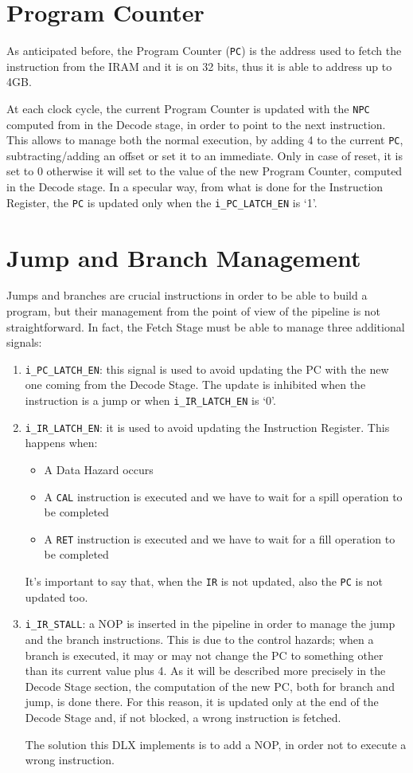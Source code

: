 \section{Program Counter}
As anticipated before, the Program Counter (\texttt{PC}) is the address used to fetch the instruction from the IRAM and it is on 32 bits, thus it is able to address up to 4GB.

At each clock cycle, the current Program Counter is updated with the \texttt{NPC} computed from in the Decode stage, in order to point to the next instruction. This allows to manage both the normal execution, by adding 4 to the current \texttt{PC}, subtracting/adding an offset or set it to an immediate. Only in case of reset, it is set to 0 otherwise it will set to the value of the new Program Counter, computed in the Decode stage. In a specular way, from what is done for the Instruction Register, the \texttt{PC} is updated only when the \texttt{i\_PC\_LATCH\_EN} is `1'.

\section{Jump and Branch Management}
\label{sec:jmp_branch}
Jumps and branches are crucial instructions in order to be able to build a program, but their management from the point of view of the pipeline is not straightforward. In fact, the Fetch Stage must be able to manage three additional signals:
\begin{enumerate}
	\item \texttt{i\_PC\_LATCH\_EN}: this signal is used to avoid updating the PC with the new one coming from the Decode Stage. The update is inhibited when the instruction is a jump or when \texttt{i\_IR\_LATCH\_EN} is `0'. 
	\item \texttt{i\_IR\_LATCH\_EN}: it is used to avoid updating the Instruction Register. This happens when:
	\begin{itemize}
		\item A Data Hazard occurs
		\item A \texttt{CAL} instruction is executed and we have to wait for a spill operation to be completed
		\item A \texttt{RET} instruction is executed and we have to wait for a fill operation to be completed
	\end{itemize}
	It's important to say that, when the \texttt{IR} is not updated, also the \texttt{PC} is not updated too.
	\item \texttt{i\_IR\_STALL}: a NOP is inserted in the pipeline in order to manage the jump and the branch instructions. This is due to the control hazards; when a branch is executed, it may or may not change the PC to something other than its current value plus 4. As it will be described more precisely in the Decode Stage section, the computation of the new PC, both for branch and jump, is done there. For this reason, it is updated only at the end of the Decode Stage and, if not blocked, a wrong instruction is fetched.
	
	The solution this DLX implements is to add a NOP, in order not to execute a wrong instruction.
\end{enumerate}